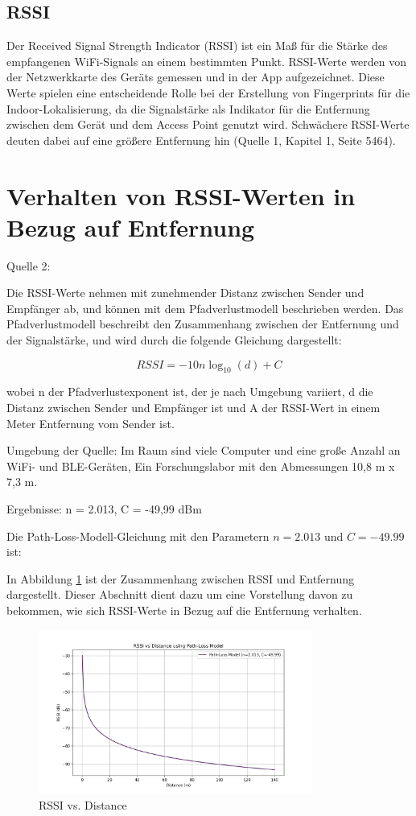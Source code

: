 \subsection{RSSI}

Der Received Signal Strength Indicator (RSSI) ist ein Maß für die Stärke des empfangenen WiFi-Signals an einem bestimmten Punkt. RSSI-Werte werden von der Netzwerkkarte des Geräts gemessen und in der App aufgezeichnet. Diese Werte spielen eine entscheidende Rolle bei der Erstellung von Fingerprints für die Indoor-Lokalisierung, da die Signalstärke als Indikator für die Entfernung zwischen dem Gerät und dem Access Point genutzt wird. Schwächere RSSI-Werte deuten dabei auf eine größere Entfernung hin (Quelle 1, Kapitel 1, Seite 5464).

\section{Verhalten von RSSI-Werten in Bezug auf Entfernung}

Quelle 2:

Die RSSI-Werte nehmen mit zunehmender Distanz zwischen Sender und Empfänger ab, und können mit dem Pfadverlustmodell beschrieben werden. Das Pfadverlustmodell beschreibt den Zusammenhang zwischen der Entfernung und der Signalstärke, und wird durch die folgende Gleichung dargestellt:

\begin{equation}
    RSSI = -10n \log_{10}(d) + C
\end{equation}

wobei n der Pfadverlustexponent ist, der je nach Umgebung variiert, d die Distanz zwischen Sender und Empfänger ist und A der RSSI-Wert in einem Meter Entfernung vom Sender ist.

Umgebung der Quelle: Im Raum sind viele Computer und eine große Anzahl an WiFi- und BLE-Geräten, Ein Forschungslabor mit den Abmessungen 10,8 m x 7,3 m.

Ergebnisse: n = 2.013, C = -49,99 dBm

Die Path-Loss-Modell-Gleichung mit den Parametern \(n = 2.013\) und \(C = -49.99\) ist:

In Abbildung \ref{fig:rssi_distance} ist der Zusammenhang zwischen RSSI und Entfernung dargestellt. Dieser Abschnitt dient dazu um eine Vorstellung davon zu bekommen, wie sich RSSI-Werte in Bezug auf die Entfernung verhalten.

\begin{figure}[h]
    \centering
    \includegraphics[width=0.8\textwidth]{images/rssi_distance.png}
    \caption{RSSI vs. Distance}
    \label{fig:rssi_distance}
\end{figure}
